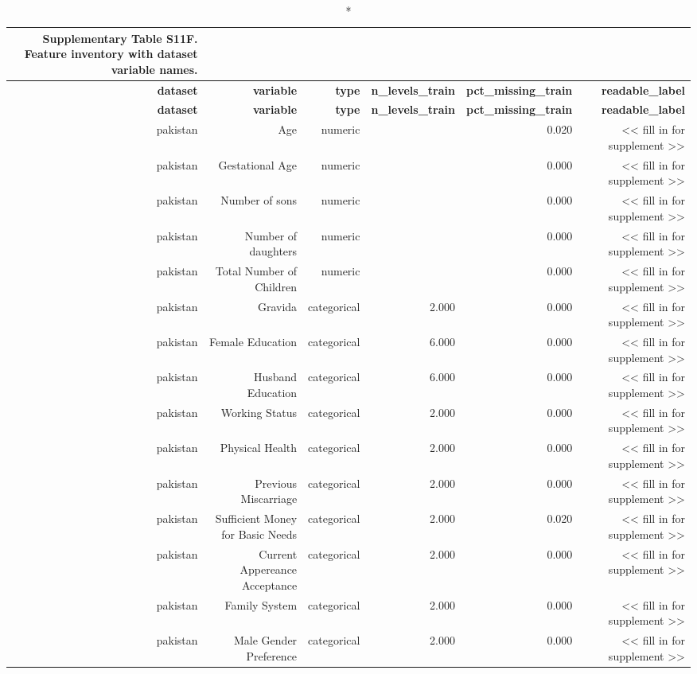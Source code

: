 \documentclass[10pt]{article}
\begin{document}
\tiny
\setlength{\tabcolsep}{2pt}
\begin{longtable}{rrrrrr}
\caption*{\textbf{Supplementary Table S11F.} Feature inventory with dataset variable names.}\\
\toprule
\textbf{dataset} & \textbf{variable} & \textbf{type} & \textbf{n\_levels\_train} & \textbf{pct\_missing\_train} & \textbf{readable\_label} \\
\midrule
\endfirsthead
\toprule
\textbf{dataset} & \textbf{variable} & \textbf{type} & \textbf{n\_levels\_train} & \textbf{pct\_missing\_train} & \textbf{readable\_label} \\
\midrule
\endhead
\bottomrule
\endfoot
pakistan & Age & numeric &  & 0.020 & << fill in for supplement >> \\
pakistan & Gestational Age & numeric &  & 0.000 & << fill in for supplement >> \\
pakistan & Number of sons  & numeric &  & 0.000 & << fill in for supplement >> \\
pakistan & Number of daughters & numeric &  & 0.000 & << fill in for supplement >> \\
pakistan & Total Number of Children & numeric &  & 0.000 & << fill in for supplement >> \\
pakistan & Gravida & categorical & 2.000 & 0.000 & << fill in for supplement >> \\
pakistan & Female Education & categorical & 6.000 & 0.000 & << fill in for supplement >> \\
pakistan & Husband Education & categorical & 6.000 & 0.000 & << fill in for supplement >> \\
pakistan & Working Status & categorical & 2.000 & 0.000 & << fill in for supplement >> \\
pakistan & Physical Health  & categorical & 2.000 & 0.000 & << fill in for supplement >> \\
pakistan & Previous Miscarriage & categorical & 2.000 & 0.000 & << fill in for supplement >> \\
pakistan & Sufficient Money for Basic Needs & categorical & 2.000 & 0.020 & << fill in for supplement >> \\
pakistan & Current Appereance Acceptance & categorical & 2.000 & 0.000 & << fill in for supplement >> \\
pakistan & Family System & categorical & 2.000 & 0.000 & << fill in for supplement >> \\
pakistan & Male Gender Preference & categorical & 2.000 & 0.000 & << fill in for supplement >> \\

\end{longtable}
\end{document}
